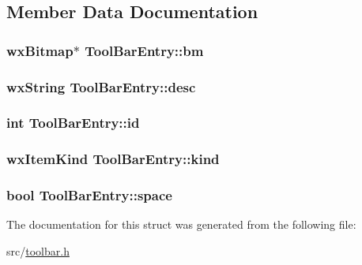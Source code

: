 \subsection{Member Data Documentation}
\hypertarget{a00145_a69d59b9f985f419ed56dce7ee0618792}{
\subsubsection[{bm}]{\setlength{\rightskip}{0pt plus 5cm}wx\-Bitmap$\ast$ Tool\-Bar\-Entry\-::bm}}\label{a00145_a69d59b9f985f419ed56dce7ee0618792}
\hypertarget{a00145_a16c9a95a9260b436c6dd2781fe58ef33}{
\subsubsection[{desc}]{\setlength{\rightskip}{0pt plus 5cm}wx\-String Tool\-Bar\-Entry\-::desc}}\label{a00145_a16c9a95a9260b436c6dd2781fe58ef33}
\hypertarget{a00145_aaccd6c831007969663f3ab345a9dd0e2}{
\subsubsection[{id}]{\setlength{\rightskip}{0pt plus 5cm}int Tool\-Bar\-Entry\-::id}}\label{a00145_aaccd6c831007969663f3ab345a9dd0e2}
\hypertarget{a00145_af1d846c95e737ada6a08a4de768ac501}{
\subsubsection[{kind}]{\setlength{\rightskip}{0pt plus 5cm}wx\-Item\-Kind Tool\-Bar\-Entry\-::kind}}\label{a00145_af1d846c95e737ada6a08a4de768ac501}
\hypertarget{a00145_ad69c99792a9810112cbee30adbee7a6e}{
\subsubsection[{space}]{\setlength{\rightskip}{0pt plus 5cm}bool Tool\-Bar\-Entry\-::space}}\label{a00145_ad69c99792a9810112cbee30adbee7a6e}


The documentation for this struct was generated from the following file\-:\begin{DoxyCompactItemize}
\item 
src/\hyperlink{a00247}{toolbar.\-h}\end{DoxyCompactItemize}
